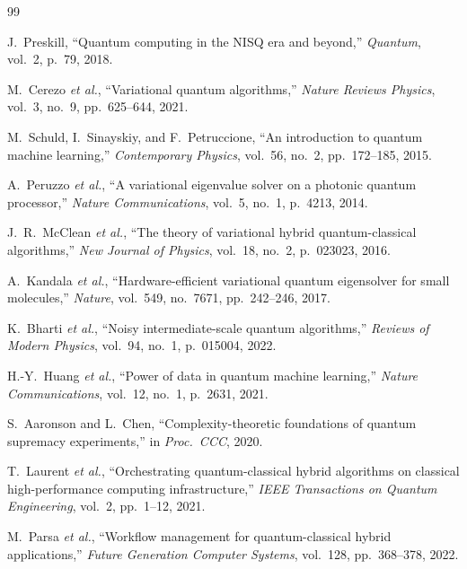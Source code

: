 \documentclass[final,5p,times,number]{elsarticle}
\begin{document}
\setcounter{table}{0}
\renewcommand{\thetable}{S\arabic{table}}
\setcounter{figure}{0}
\renewcommand{\thefigure}{S\arabic{figure}}


\begin{thebibliography}{99}

  J.~Preskill, ``Quantum computing in the NISQ era and beyond,'' \emph{Quantum}, vol.~2, p.~79, 2018.

  M.~Cerezo \emph{et al.}, ``Variational quantum algorithms,'' \emph{Nature Reviews Physics}, vol.~3, no.~9, pp.~625--644, 2021.

  M.~Schuld, I.~Sinayskiy, and F.~Petruccione, ``An introduction to quantum machine learning,'' \emph{Contemporary Physics}, vol.~56, no.~2, pp.~172--185, 2015.

  A.~Peruzzo \emph{et al.}, ``A variational eigenvalue solver on a photonic quantum processor,'' \emph{Nature Communications}, vol.~5, no.~1, p.~4213, 2014.

  J.~R.~McClean \emph{et al.}, ``The theory of variational hybrid quantum-classical algorithms,'' \emph{New Journal of Physics}, vol.~18, no.~2, p.~023023, 2016.

  A.~Kandala \emph{et al.}, ``Hardware-efficient variational quantum eigensolver for small molecules,'' \emph{Nature}, vol.~549, no.~7671, pp.~242--246, 2017.

  K.~Bharti \emph{et al.}, ``Noisy intermediate-scale quantum algorithms,'' \emph{Reviews of Modern Physics}, vol.~94, no.~1, p.~015004, 2022.

  H.-Y.~Huang \emph{et al.}, ``Power of data in quantum machine learning,'' \emph{Nature Communications}, vol.~12, no.~1, p.~2631, 2021.

  S.~Aaronson and L.~Chen, ``Complexity-theoretic foundations of quantum supremacy experiments,'' in \emph{Proc.\ CCC}, 2020.

  T.~Laurent \emph{et al.}, ``Orchestrating quantum-classical hybrid algorithms on classical high-performance computing infrastructure,'' \emph{IEEE Transactions on Quantum Engineering}, vol.~2, pp.~1--12, 2021.

  M.~Parsa \emph{et al.}, ``Workflow management for quantum-classical hybrid applications,'' \emph{Future Generation Computer Systems}, vol.~128, pp.~368--378, 2022.


\end{thebibliography}
\end{document}
